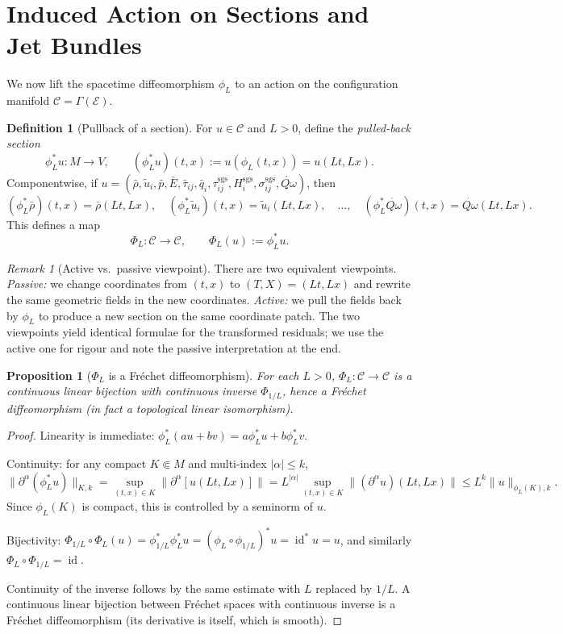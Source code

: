 \documentclass[11pt]{article}
\newtheorem{proposition}[theorem]{Proposition}
\theoremstyle{definition}
\newtheorem{definition}[theorem]{Definition}
\theoremstyle{remark}
\newtheorem{remark}[theorem]{Remark}
\newcommand{\E}{\mathcal{E}}
\newcommand{\id}{\operatorname{id}}
\newcommand{\sgs}{\mathrm{sgs}}
\newcommand{\barrho}{\bar{\rho}}
\newcommand{\barp}{\bar{p}}
\newcommand{\barE}{\bar{E}}
\newcommand{\bartau}{\bar{\tau}}
\newcommand{\barq}{\bar{q}}
\newcommand{\tilu}{\widetilde{u}}
\newcommand{\Qdot}{\dot{Q\omega}}
\begin{document}
\section{Induced Action on Sections and Jet Bundles}
\label{sec:induced}

We now lift the spacetime diffeomorphism $\phi_L$ to an action on the
configuration manifold $\mathcal C=\Gamma(\E)$.

\begin{definition}[Pullback of a section]
For $u\in\mathcal C$ and $L>0$, define the \emph{pulled-back section}
\[
\phi_L^*u:M\to V,\qquad (\phi_L^*u)(t,x):=u(\phi_L(t,x))=u(Lt,Lx).
\]
Componentwise, if $u=(\barrho,\tilu_i,\barp,\barE,\bartau_{ij},\barq_i,
\tau^{\sgs}_{ij},H^{\sgs}_i,\sigma^{\sgs}_{ij},\Qdot)$, then
\[
(\phi_L^*\barrho)(t,x)=\barrho(Lt,Lx),\quad
(\phi_L^*\tilu_i)(t,x)=\tilu_i(Lt,Lx),\quad\ldots,\quad
(\phi_L^*\Qdot)(t,x)=\Qdot(Lt,Lx).
\]
This defines a map
\[
\Phi_L:\mathcal C\to\mathcal C,\qquad \Phi_L(u):=\phi_L^*u.
\]
\end{definition}

\begin{remark}[Active vs.\ passive viewpoint]
There are two equivalent viewpoints.  \emph{Passive:} we change coordinates
from $(t,x)$ to $(T,X)=(Lt,Lx)$ and rewrite the same geometric fields in the
new coordinates.  \emph{Active:} we pull the fields back by $\phi_L$ to
produce a new section on the same coordinate patch.  The two viewpoints yield
identical formulae for the transformed residuals; we use the active one for
rigour and note the passive interpretation at the end.
\end{remark}

\begin{proposition}[$\Phi_L$ is a Fr\'echet diffeomorphism]
\label{prop:frechet-diffeo}
For each $L>0$, $\Phi_L:\mathcal C\to\mathcal C$ is a continuous linear
bijection with continuous inverse $\Phi_{1/L}$, hence a Fr\'echet
diffeomorphism (in fact a topological linear isomorphism).
\end{proposition}

\begin{proof}
Linearity is immediate: $\phi_L^*(au+bv)=a\phi_L^*u+b\phi_L^*v$.

Continuity: for any compact $K\Subset M$ and multi-index $|\alpha|\le k$,
\[
\|\partial^\alpha(\phi_L^*u)\|_{K,k}
=\sup_{(t,x)\in K}\|\partial^\alpha[u(Lt,Lx)]\|
=L^{|\alpha|}\sup_{(t,x)\in K}\|(\partial^\alpha u)(Lt,Lx)\|
\le L^k\|u\|_{\phi_L(K),k}.
\]
Since $\phi_L(K)$ is compact, this is controlled by a seminorm of $u$.

Bijectivity: $\Phi_{1/L}\circ\Phi_L(u)=\phi_{1/L}^*\phi_L^*u
=(\phi_L\circ\phi_{1/L})^*u=\id^*u=u$, and similarly
$\Phi_L\circ\Phi_{1/L}=\id$.

Continuity of the inverse follows by the same estimate with $L$ replaced by
$1/L$.  A continuous linear bijection between Fr\'echet spaces with
continuous inverse is a Fr\'echet diffeomorphism (its derivative is itself,
which is smooth).
\end{proof}
\end{document}
